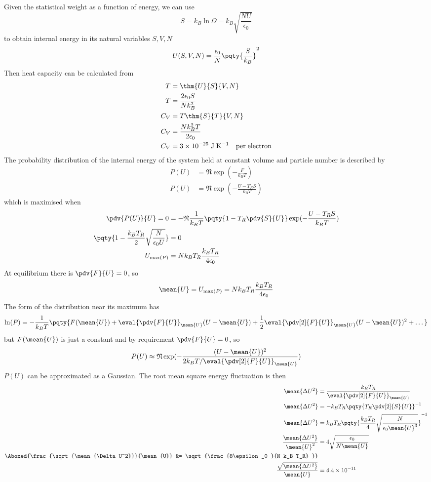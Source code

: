 \documentclass[12pt]{article}
\begin{document}
     \subsection{} Given the statistical weight as a function of energy, we can use \[
        S = k_B\ln \Omega = k_B \sqrt{\frac{NU}{\epsilon_0}}
    \]
    to obtain internal energy in its natural variables \(S,V,N\) \[
        U(S,V,N) = \frac{\epsilon_0}{N}\pqty{\frac{S}{k_B}}^2
    \]
    Then heat capacity can be calculated from \begin{align*}
        T &= \thm{U}{S}{V,N}\\
        T&= \frac{2\epsilon_0 S}{Nk_B^2}\\
        C_V &= T \thm{S}{T}{V,N}\\
        C_V &= \frac{N k_B^2 T}{2\epsilon_0}\\
        C_V &= 3 \times 10^{ - 25}\; \mathrm{J\; K^{ - 1}\quad per\; electron}
    \end{align*}
    The probability distribution of the internal energy of the system held at constant volume and particle number is described by \begin{align*}
        P(U) &= \mathfrak{N} \exp( -\frac{F}{k_BT} )\\
        P(U) &= \mathfrak{N} \exp( -\frac{U - T_R S}{k_BT} )
    \end{align*}
    which is maximised when \begin{align*}
        \pdv{P(U)}{U} = 0 &=  -\mathfrak{N} \frac{1}{k_BT} \pqty{1 - T_R \pdv{S}{U}}\exp( -\frac{U - T_R S}{k_BT} ) \\
        \pqty{1 - \frac{k_BT_R}{2}  \sqrt{\frac{N}{\epsilon_0 U}}} &=  0\\
        U_{\max(P)} &= Nk_BT_R\frac{k_B T_R}{4\epsilon_0}
    \end{align*}
    At equilibrium there is \(\pdv{F}{U} = 0\), so \[
        \mean{U} = U_{\max(P)} = Nk_BT_R\frac{k_B T_R}{4\epsilon_0}
    \]The form of the distribution near its maximum has \[
        \ln(P) = - \frac{1}{k_BT} \pqty{F(\mean{U}) + \eval{\pdv{F}{U}}_{\mean{U}} (U -\mean{U}) + \frac{1}{2}\eval{\pdv[2]{F}{U}}_{\mean{U}} (U -\mean{U})^2 + \dots }
    \]
    but \(F(\mean{U})\) is just a constant and by requirement \(\pdv{F}{U} = 0\), so \[
        P(U) \approx \mathfrak{N}\exp( - \dfrac{(U -\mean{U})^2}{2k_B T/ \eval{\pdv[2]{F}{U}}_{\mean{U}}})
    \]
    \(P(U)\) can be approximated as a Gaussian. The root mean square energy fluctuation is then \begin{align*}
        \mean{\Delta U^2} &= \frac{k_B T_R}{ \eval{\pdv[2]{F}{U}}_{\mean{U}}}\\
        \mean{\Delta U^2} &= - {k_B T_R} \pqty{T_R \pdv[2]{S}{U}}^{-1}\\
        \mean{\Delta U^2} &= k_B T_R \pqty{ \frac{k_B T_R}{4}\sqrt{\frac{N}{\epsilon_0 \mean{U}^3}}}^{-1}\\
        \frac{\mean{\Delta U^2}}{\mean{U}^2}  &= 4\sqrt{\frac{\epsilon_0 }{N \mean{U}} }\\
        \Aboxed{\frac{\sqrt{\mean{\Delta U^2}}}{\mean{U}}  &= \sqrt{\frac{8\epsilon_0 }{N k_B T_R} }}\\
        \frac{\sqrt{\mean{\Delta U^2}}}{\mean{U}} &= 4.4 \times 10^{ - 11}
    \end{align*}
\end{document}
